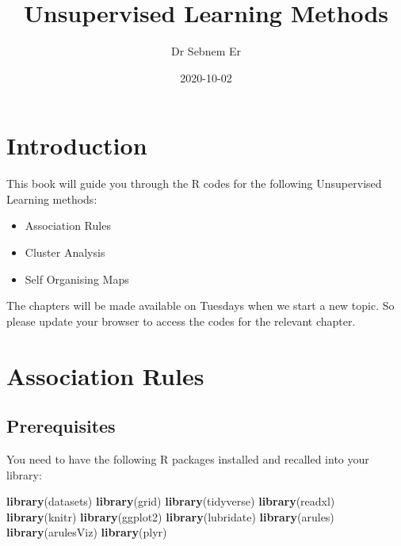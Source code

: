 \documentclass[
]{book}
\title{Unsupervised Learning Methods}
\author{Dr Sebnem Er}
\date{2020-10-02}
\newenvironment{Shaded}{\begin{snugshade}}{\end{snugshade}}
\newcommand{\KeywordTok}[1]{\textcolor[rgb]{0.13,0.29,0.53}{\textbf{#1}}}
\newcommand{\NormalTok}[1]{#1}
\providecommand{\tightlist}{%
  \setlength{\itemsep}{0pt}\setlength{\parskip}{0pt}}
\begin{document}
\maketitle

{
\setcounter{tocdepth}{1}
\tableofcontents
}
\hypertarget{introduction}{%
\chapter{Introduction}\label{introduction}}

This book will guide you through the R codes for the following Unsupervised Learning methods:

\begin{itemize}
\tightlist
\item
  Association Rules
\item
  Cluster Analysis
\item
  Self Organising Maps
\end{itemize}

The chapters will be made available on Tuesdays when we start a new topic. So please update your browser to access the codes for the relevant chapter.

\hypertarget{association-rules}{%
\chapter{Association Rules}\label{association-rules}}

\hypertarget{prerequisites}{%
\section{Prerequisites}\label{prerequisites}}

You need to have the following R packages installed and recalled into your library:

\begin{Shaded}
\begin{Highlighting}[]
\KeywordTok{library}\NormalTok{(datasets)}
\KeywordTok{library}\NormalTok{(grid)}
\KeywordTok{library}\NormalTok{(tidyverse)}
\KeywordTok{library}\NormalTok{(readxl)}
\KeywordTok{library}\NormalTok{(knitr)}
\KeywordTok{library}\NormalTok{(ggplot2)}
\KeywordTok{library}\NormalTok{(lubridate)}
\KeywordTok{library}\NormalTok{(arules)}
\KeywordTok{library}\NormalTok{(arulesViz)}
\KeywordTok{library}\NormalTok{(plyr)}
\end{Highlighting}
\end{Shaded}
\end{document}
